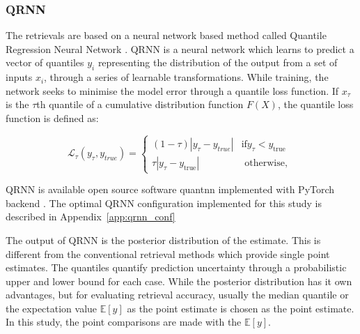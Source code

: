 \documentclass[amt, manuscript]{copernicus}
\begin{document}
\subsubsection{QRNN}
%
\label{sec:QRNN}

The retrievals are based on a neural network based method called Quantile Regression Neural Network \citep[QRNN,][]{pfreundschuh:aneur:18}. QRNN is a neural network which learns to predict a vector of quantiles {$y_i$} representing the distribution of the output from a set of inputs {$x_i$}, through a series of learnable transformations. While training, the network seeks to minimise the model error through a quantile loss function. If $x_{\tau}$ is the $\tau$th quantile of a cumulative distribution function $F(X)$, the quantile loss function is defined as:

\begin{equation}
\mathcal{L}_\tau(y_\tau, y_{true}) = \begin{cases}
(1 - \tau)|y_\tau - y_{true}| & \text{if}  y_\tau < y_\text{true}\\
\tau |y_\tau - y_\text{true}| & \text{ otherwise, }
\end{cases}
\label{loss_function}
\end{equation}

QRNN is available open source software quantnn \citep{quantnn:21} implemented with PyTorch backend \citep{paszke2017automatic}. The optimal QRNN configuration implemented for this study is described in Appendix~\ref{app:qrnn_conf}

The output of QRNN is the posterior distribution of the estimate. This is different from the conventional retrieval methods which provide single point estimates. The quantiles quantify prediction uncertainty through a probabilistic upper and lower bound for each case. While the posterior distribution has it own advantages, but for evaluating retrieval accuracy, usually the median quantile or the  expectation value $\mathbb{E}[y]$ as the point estimate is chosen as the point estimate. In this study, the point comparisons are made with the $\mathbb{E}[y]$. 
 
\end{document}
